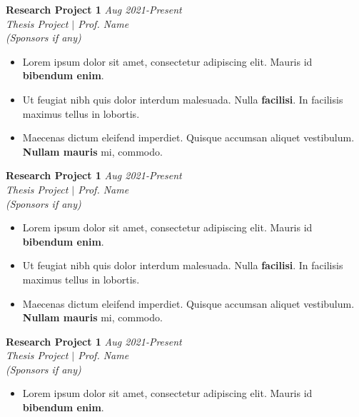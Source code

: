 \documentclass[9pt]{article}
\newenvironment{changemargin}[2]{%
  \begin{list}{}{%
    \setlength{\topsep}{0pt}%
    \setlength{\leftmargin}{#1}%
    \setlength{\rightmargin}{#2}%
    \setlength{\listparindent}{\parindent}%
    \setlength{\itemindent}{\parindent}%
    \setlength{\parsep}{\parskip}%
  }%
  \item[]}{\end{list}
}
\newcommand{\jobdescription}[1]{
	\begin{changemargin}{0.05in}{0.05in}
    \smallskip
		{#1}
    \medskip
	\end{changemargin}
}
\newcommand{\jobtitle}[3]{
	\textbf{#1} \hfill \emph{#3}\\
	\emph{#2}
}
\newenvironment{body} {
	\vspace*{-16pt}
	\begin{changemargin}{-0.65in}{-0.5in}
  }	
	{\end{changemargin}
}
\begin{document}
\begin{body}
    \jobtitle{Research Project 1}{Thesis Project $|$ Prof. Name \\(Sponsors if any)}{Aug 2021-Present}
  \jobdescription{
  	\begin{itemize} \itemsep -0pt  %
  		\item Lorem ipsum dolor sit amet, consectetur adipiscing elit. Mauris id \textbf{bibendum enim}. 
  		\item Ut feugiat nibh quis dolor interdum malesuada. Nulla \textbf{facilisi}. In facilisis maximus tellus in lobortis.  
  \item Maecenas dictum eleifend imperdiet. Quisque accumsan aliquet vestibulum. \textbf{Nullam mauris} mi, commodo. 
  	\end{itemize}
  }
    \jobtitle{Research Project 1}{Thesis Project $|$ Prof. Name \\(Sponsors if any)}{Aug 2021-Present}
  \jobdescription{
  	\begin{itemize} \itemsep -0pt  %
  		\item Lorem ipsum dolor sit amet, consectetur adipiscing elit. Mauris id \textbf{bibendum enim}. 
  		\item Ut feugiat nibh quis dolor interdum malesuada. Nulla \textbf{facilisi}. In facilisis maximus tellus in lobortis.  
  \item Maecenas dictum eleifend imperdiet. Quisque accumsan aliquet vestibulum. \textbf{Nullam mauris} mi, commodo. 
  	\end{itemize}
  }
    \jobtitle{Research Project 1}{Thesis Project $|$ Prof. Name \\(Sponsors if any)}{Aug 2021-Present}
  \jobdescription{
  	\begin{itemize} \itemsep -0pt  %
  		\item Lorem ipsum dolor sit amet, consectetur adipiscing elit. Mauris id \textbf{bibendum enim}. 

\end{itemize}}
\end{body}
\end{document}

